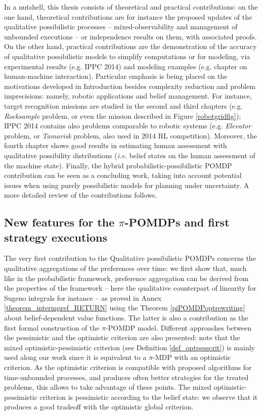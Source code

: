 In a nutshell, 
this thesis consists of
theoretical and practical contributions:
on the one hand, theoretical contributions 
are for instance 
the proposed updates of the qualitative possibilistic processes
-- mixed-observability and management of unbounded executions -- 
or independence results on them, with associated proofs.
On the other hand, 
practical contributions
are the demonstration of the accuracy 
of qualitative possibilistic models
to simplify computations or for modeling,
via experimental results (e.g. IPPC 2014) 
and modeling examples (e.g. chapter on human-machine interaction).
Particular emphasis is being placed 
on the motivations developed in Introduction
besides complexity reduction and problem imprecisions:
namely, robotic applications and belief management.
For instance, target recognition missions 
are studied in the second and third chapters 
(e.g. \textit{Rocksample} problem, 
or even the mission described in Figure \ref{robotgridfig});
IPPC 2014 contains also problems comparable to robotic systems 
(e.g. \textit{Elevator} problem, or \textit{Tamarisk} problem, also used in 2014 RL competition). 
Moreover, the fourth chapter shows good results 
in estimating human assessment with qualitative possibility distributions
(\textit{i.e.} belief states on the human assessment of the machine state).
Finally, the hybrid probabilistic-possibilistic POMDP contribution 
can be seen as a concluding work, taking into account
potential issues when using purely possibilistic models 
for planning under uncertainty.
A more detailed review of the contributions follows.

\subsection*{New features for the $\pi$-POMDPs
and first strategy executions}
The very first contribution 
to the Qualitative possibilistic 
POMDPs \cite{Sabbadin:1999:pipomdp} 
concerns the qualitative aggregations 
of the preferences over time:
we first show that, 
much like in the probabilistic framework,
preference aggregation can be derived 
from the properties of the framework 
-- here the qualitative counterpart 
of linearity
for Sugeno integrals for instance --
as proved in Annex \ref{theorem_intermpref_RETURN} 
using the Theorem \ref{piPOMDPoptrewriting} 
about belief-dependent value functions.
The latter is also a contribution 
as the first formal construction
of the $\pi$-POMDP model.
Different approaches between the pessimistic and the optimistic criterion
are also presented: 
note that the mixed optimistic-pessimistic criterion 
(see Definition \ref{def_optpesscrit}) 
is mainly used along our work 
since it is equivalent to 
a $\pi$-MDP with an optimistic criterion.
As the optimistic criterion is compatible 
with proposed algorithms for time-unbounded processes,
and produces often better strategies 
for the treated problems,
this allows to take advantage of these points.
The mixed optimistic-pessimistic criterion 
is pessimistic according to the belief state:
we observe that it produces a good tradeoff
with the optimistic global criterion.

